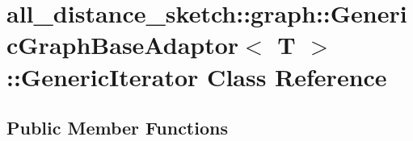 \hypertarget{classall__distance__sketch_1_1graph_1_1GenericGraphBaseAdaptor_1_1GenericIterator}{}\section{all\+\_\+distance\+\_\+sketch\+:\+:graph\+:\+:Generic\+Graph\+Base\+Adaptor$<$ T $>$\+:\+:Generic\+Iterator Class Reference}
\label{classall__distance__sketch_1_1graph_1_1GenericGraphBaseAdaptor_1_1GenericIterator}
\subsection*{Public Member Functions}
